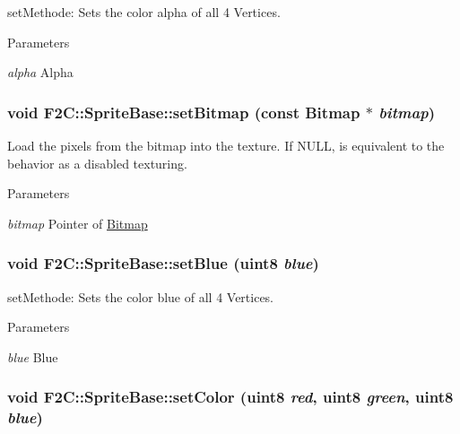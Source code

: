 setMethode: Sets the color alpha of all 4 Vertices. 
\begin{DoxyParams}{Parameters}
\item[{\em alpha}]Alpha \end{DoxyParams}
\hypertarget{class_f2_c_1_1_sprite_base_a94df734d094880352b1dc517a9332faa}{
\subsubsection[{setBitmap}]{\setlength{\rightskip}{0pt plus 5cm}void F2C::SpriteBase::setBitmap (const {\bf Bitmap} $\ast$ {\em bitmap})}}
\label{class_f2_c_1_1_sprite_base_a94df734d094880352b1dc517a9332faa}


Load the pixels from the bitmap into the texture. If NULL, is equivalent to the behavior as a disabled texturing. 
\begin{DoxyParams}{Parameters}
\item[{\em bitmap}]Pointer of \hyperlink{class_f2_c_1_1_bitmap}{Bitmap} \end{DoxyParams}
\hypertarget{class_f2_c_1_1_sprite_base_ae08702a286ecfde0cf4ef8aacc8c9656}{
\subsubsection[{setBlue}]{\setlength{\rightskip}{0pt plus 5cm}void F2C::SpriteBase::setBlue ({\bf uint8} {\em blue})}}
\label{class_f2_c_1_1_sprite_base_ae08702a286ecfde0cf4ef8aacc8c9656}


setMethode: Sets the color blue of all 4 Vertices. 
\begin{DoxyParams}{Parameters}
\item[{\em blue}]Blue \end{DoxyParams}
\hypertarget{class_f2_c_1_1_sprite_base_ad28077e5723498e1257b461abd805395}{
\subsubsection[{setColor}]{\setlength{\rightskip}{0pt plus 5cm}void F2C::SpriteBase::setColor ({\bf uint8} {\em red}, \/  {\bf uint8} {\em green}, \/  {\bf uint8} {\em blue})}}
\label{class_f2_c_1_1_sprite_base_ad28077e5723498e1257b461abd805395}


